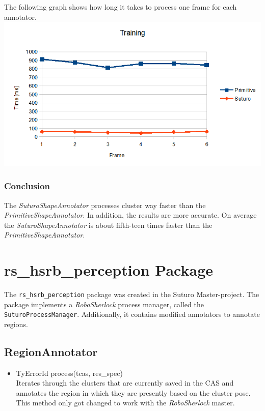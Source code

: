 \documentclass[main.tex]{subfiles}
\begin{document}
The following graph shows how long it takes to process one frame for each annotator.
{\center
  \includegraphics[width=1.2\textwidth]{pictures/perception/shape_annotator/classification_test_training/chart.png}
}

\subsubsection{Conclusion}
The \textit{SuturoShapeAnnotator} processes cluster way faster than the \textit{PrimitiveShapeAnnotator}. In addition, the results are more accurate.
On average the \textit{SuturoShapeAnnotator} is about fifth-teen times faster than the \textit{PrimitiveShapeAnnotator}.

\section{rs\_hsrb\_perception Package}

The \texttt{rs\_hsrb\_perception} package was created in the Suturo Master-project. The package implements a \textit{RoboSherlock} process manager, called the\\ \texttt{SuturoProcessManager}. Additionally, it contains modified annotators to annotate regions.

\subsection{RegionAnnotator}
\begin{itemize}
\item TyErrorId process(tcas, res\_spec)\\
Iterates through the clusters that are currently saved in the CAS and annotates the region in which they are presently based on the cluster pose.
This method only got changed to work with the \textit{RoboSherlock} master.
\end{itemize}
\end{document}
